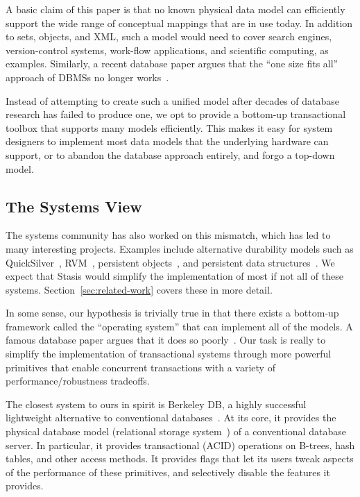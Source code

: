\documentclass[letterpaper,twocolumn,10pt]{article}
\newcommand{\yad}{Stasis\xspace}
\begin{document}
A basic claim of this paper is that no known physical data model can
efficiently support the wide range of conceptual mappings that are in
use today.  In addition to sets, objects, and XML, such a model would
need to cover search engines, version-control systems, work-flow
applications, and scientific computing, as examples.  Similarly, a
recent database paper argues that the ``one size fits all'' approach of
DBMSs no longer works~\cite{oneSizeFitsAll}.

Instead of attempting to create such a unified model after decades of
database research has failed to produce one, we opt to provide a
bottom-up transactional toolbox that supports many models
efficiently.  This makes it easy for system designers to
implement most data models that the underlying hardware can
support, or to abandon the database approach entirely, and forgo 
a top-down model.

\subsection{The Systems View}
\label{sec:systems}

The systems community has also worked on this mismatch, which has led
to many interesting projects.  Examples include alternative durability
models such as QuickSilver~\cite{experienceWithQuickSilver},
RVM~\cite{lrvm}, persistent objects~\cite{argus}, and persistent data structures~\cite{DDS,boxwood}.  We expect that \yad
would simplify the implementation of most if not all of these systems.
Section~\ref{sec:related-work} covers these in more detail.

In some sense, our hypothesis is trivially true in that there exists a
bottom-up framework called the ``operating system'' that can implement
all of the models. A famous database paper argues that it does so
poorly~\cite{Stonebraker81}. Our task is really to
simplify the implementation of transactional systems through more
powerful primitives that enable concurrent transactions with a variety
of performance/robustness tradeoffs.

The closest system to ours in spirit is Berkeley DB, a highly successful lightweight alternative to conventional 
databases~\cite{libtp}.  At its core, it provides the physical database model
(relational storage system~\cite{systemR}) of a conventional database server.
In particular, 
it provides transactional (ACID) operations on B-trees, 
hash tables, and other access methods.  It provides flags that 
let its users tweak aspects of the performance of these
primitives, and selectively disable the features it provides.
\end{document}
